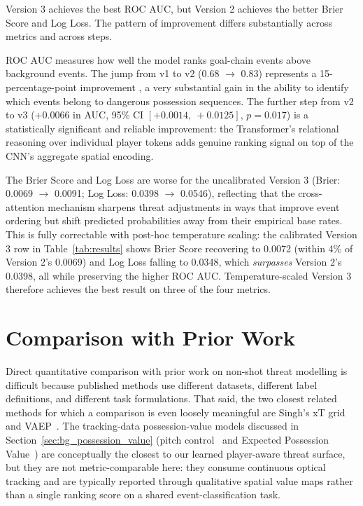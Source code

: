 Version 3 achieves the best ROC AUC, but Version 2 achieves the better Brier Score and Log Loss. The pattern of improvement differs substantially across metrics and across steps.

ROC AUC measures how well the model ranks goal-chain events above background events. The jump from v1 to v2 (0.68 $\to$ 0.83) represents a 15-percentage-point improvement , a very substantial gain in the ability to identify which events belong to dangerous possession sequences. The further step from v2 to v3 ($+0.0066$ in AUC, 95\% CI $[+0.0014,\ +0.0125]$, $p = 0.017$) is a statistically significant and reliable improvement: the Transformer's relational reasoning over individual player tokens adds genuine ranking signal on top of the CNN's aggregate spatial encoding.

The Brier Score and Log Loss are worse for the uncalibrated Version 3 (Brier: 0.0069 $\to$ 0.0091; Log Loss: 0.0398 $\to$ 0.0546), reflecting that the cross-attention mechanism sharpens threat adjustments in ways that improve event ordering but shift predicted probabilities away from their empirical base rates. This is fully correctable with post-hoc temperature scaling: the calibrated Version 3 row in Table~\ref{tab:results} shows Brier Score recovering to 0.0072 (within 4\% of Version 2's 0.0069) and Log Loss falling to 0.0348, which \textit{surpasses} Version 2's 0.0398, all while preserving the higher ROC AUC. Temperature-scaled Version 3 therefore achieves the best result on three of the four metrics.

\section{Comparison with Prior Work}\label{sec:baseline}

Direct quantitative comparison with prior work on non-shot threat modelling is difficult because published methods use different datasets, different label definitions, and different task formulations. That said, the two closest related methods for which a comparison is even loosely meaningful are Singh's xT grid~\cite{singh2019} and VAEP~\cite{decroos2019}. The tracking-data possession-value models discussed in Section~\ref{sec:bg_possession_value} (pitch control~\cite{spearman2018} and Expected Possession Value~\cite{fernandez2019epv}) are conceptually the closest to our learned player-aware threat surface, but they are not metric-comparable here: they consume continuous optical tracking and are typically reported through qualitative spatial value maps rather than a single ranking score on a shared event-classification task.

